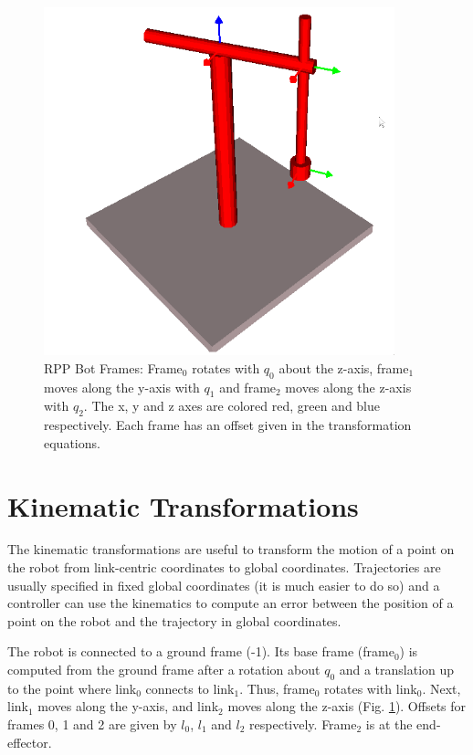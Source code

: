 \documentclass[12pt]{article}
\begin{document}
\begin{figure}[ht!]
\begin{center}
\includegraphics[width=4in]{figs/rpp-bot-frames.png}
\caption{RPP Bot Frames: Frame$_0$ rotates with $q_0$ about the z-axis, frame$_1$ moves along the y-axis 
with $q_1$ and frame$_2$ moves along the z-axis with $q_2$. The x, y and z axes are colored red, green 
and blue respectively. Each frame has an offset given in the transformation equations.}
\label{fig:rppframes}
\end{center}
\end{figure}

\section{Kinematic Transformations}
The kinematic transformations are useful to transform the motion of a point on the robot
from link-centric coordinates to global coordinates. Trajectories are usually specified in
fixed global coordinates (it is much easier to do so) and a controller can use the kinematics to
compute an error between the position of a point on the robot and the trajectory in global
coordinates.

The robot is connected to a ground frame (-1). Its base frame (frame$_0$) is computed
from the ground frame after a rotation about $q_0$ and a translation up to the
point where link$_0$ connects to link$_1$. Thus, frame$_0$ rotates with link$_0$.
Next, link$_1$ moves along the y-axis, and link$_2$ moves along the z-axis (Fig. \ref{fig:rppframes}).
Offsets for frames 0, 1 and 2 are given by $l_0$, $l_1$ and $l_2$ respectively. Frame$_2$ is at the
end-effector.
\end{document}
